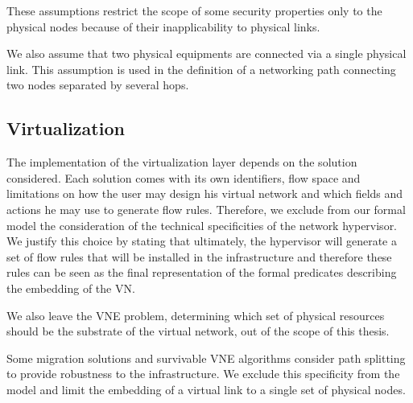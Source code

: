 These assumptions  restrict the scope of some security properties only to the physical nodes because of their inapplicability to physical links.

We also assume that two physical equipments are connected via a single physical link. This assumption is used in the definition of a networking path connecting two nodes separated by several hops.

\subsection{Virtualization}
The implementation of the virtualization layer depends on the solution considered.
Each solution comes with its own identifiers, flow space and limitations on how the user may design his virtual network and which fields and actions he may use to generate flow rules. Therefore, we exclude from our formal model the consideration of the technical specificities of the network hypervisor.
We justify this choice by stating that ultimately, the hypervisor will generate a set of flow rules that will be installed in the infrastructure and therefore these rules can be seen as the final representation of the formal predicates describing the embedding of the VN.

We also leave the VNE problem, \ie determining which set of physical resources should be the substrate of the virtual network, out of the scope of this thesis.

Some migration solutions and survivable VNE algorithms consider path splitting to provide robustness to the infrastructure.
We exclude this specificity from the model and limit the embedding of a virtual link to a single set of physical nodes.
